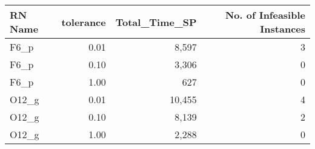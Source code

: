 \begin{tabular}{lrrr}
\toprule
RN Name &  tolerance & Total_Time_SP & No. of Infeasible Instances \\
\midrule
  F6\_p &       0.01 &         8,597 &                           3 \\
  F6\_p &       0.10 &         3,306 &                           0 \\
  F6\_p &       1.00 &           627 &                           0 \\
 O12\_g &       0.01 &        10,455 &                           4 \\
 O12\_g &       0.10 &         8,139 &                           2 \\
 O12\_g &       1.00 &         2,288 &                           0 \\
\bottomrule
\end{tabular}
